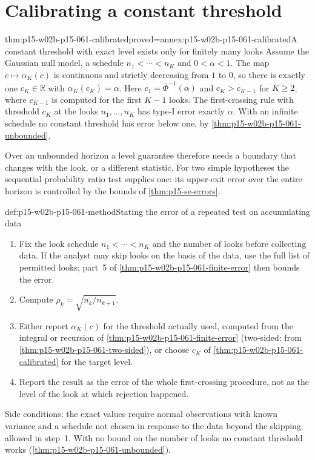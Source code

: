 \section{Calibrating a constant threshold}
\label{sec:p15-w02b-p15-061-calibration}

\begin{hbtheorem}{thm:p15-w02b-p15-061-calibrated}{proved=annex:p15-w02b-p15-061-calibrated}{A constant threshold with exact level exists only for finitely many looks}
Assume the Gaussian null model, a schedule \(n_1<\cdots<n_K\) and
\(0<\alpha<1\). The map \(c\mapsto\alpha_K(c)\) is continuous and
strictly decreasing from \(1\) to \(0\), so there is exactly one
\(c_K\in\mathbb R\) with \(\alpha_K(c_K)=\alpha\). Here
\(c_1=\bar\Phi^{-1}(\alpha)\) and \(c_{K}>c_{K-1}\) for \(K\geq2\),
where \(c_{K-1}\) is computed for the first \(K-1\) looks.
The first-crossing rule with threshold \(c_K\) at the looks
\(n_1,\ldots,n_K\) has type-I error exactly \(\alpha\).
With an infinite schedule no constant threshold has error below one, by
\cref{thm:p15-w02b-p15-061-unbounded}.
\end{hbtheorem}

Over an unbounded horizon a level guarantee therefore needs a boundary
that changes with the look, or a different statistic. For two simple
hypotheses the sequential probability ratio test supplies one: its
upper-exit error over the entire horizon is controlled by the bounds of
\cref{thm:p15-se-errors}.

\begin{hbmethod}{def:p15-w02b-p15-061-method}{Stating the error of a repeated test on accumulating data}
\begin{enumerate}
\item Fix the look schedule \(n_1<\cdots<n_K\) and the number of looks
before collecting data. If the analyst may skip looks on the basis of
the data, use the full list of permitted looks; part~5 of
\cref{thm:p15-w02b-p15-061-finite-error} then bounds the error.
\item Compute \(\rho_k=\sqrt{n_k/n_{k+1}}\).
\item Either report \(\alpha_K(c)\) for the threshold actually used,
computed from the integral or recursion of
\cref{thm:p15-w02b-p15-061-finite-error} (two-sided: from
\cref{thm:p15-w02b-p15-061-two-sided}), or choose \(c_K\) of
\cref{thm:p15-w02b-p15-061-calibrated} for the target level.
\item Report the result as the error of the whole first-crossing
procedure, not as the level of the look at which rejection happened.
\end{enumerate}
Side conditions: the exact values require normal observations with known
variance and a schedule not chosen in response to the data beyond the
skipping allowed in step~1. With no bound on the number of looks no
constant threshold works (\cref{thm:p15-w02b-p15-061-unbounded}).
\end{hbmethod}

